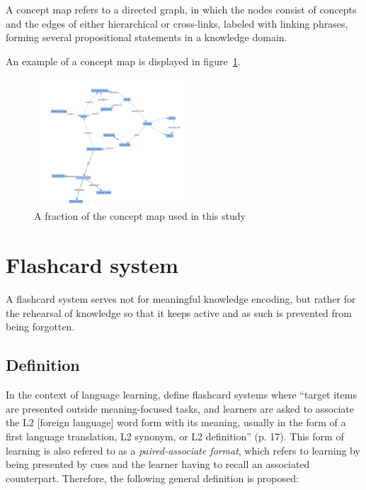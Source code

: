 \begin{definition}
    A concept map refers to a directed graph, in which the nodes consist of concepts and the edges of either hierarchical or cross-links, labeled with linking phrases, forming several propositional statements in a knowledge domain.
\end{definition}

An example of a concept map is displayed in figure~\ref{fig:examplemap}.

\begin{figure}
    \centering
    \includegraphics[width=0.5\textwidth]{img/conceptmap.png}
    \caption{A fraction of the concept map used in this study}
    \label{fig:examplemap}
\end{figure}


\section{Flashcard system}

A flashcard system serves not for meaningful knowledge encoding, but rather for the rehearsal of knowledge so that it keeps active and as such is prevented from being forgotten.

\subsection{Definition}

In the context of language learning,  define flashcard systems where ``target items are presented outside meaning-focused tasks, and learners are asked to associate the L2 [foreign language] word form with its meaning, usually in the form of a first language translation, L2 synonym, or L2 definition'' (p. 17). This form of learning is also refered to as a \emph{paired-associate format}, which refers to learning by being presented by cues and the learner having to recall an associated counterpart. Therefore, the following general definition is proposed:

